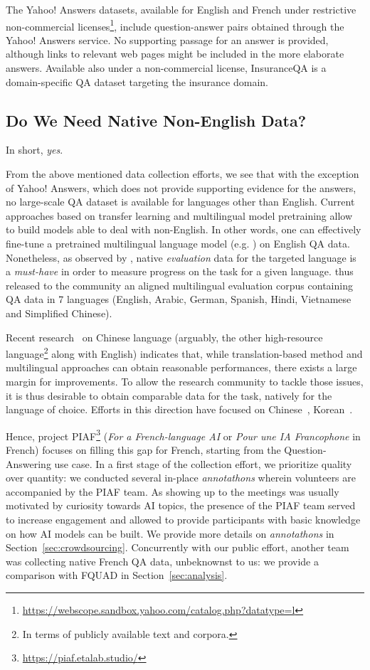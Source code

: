 \documentclass[10pt, a4paper]{article}
\begin{document}
The Yahoo! Answers datasets, available for English and French under restrictive non-commercial licenses\footnote{\url{https://webscope.sandbox.yahoo.com/catalog.php?datatype=l}}, include question-answer pairs obtained through the Yahoo! Answers service. No supporting passage for an answer is provided, although links to relevant web pages might be included in the more elaborate answers. Available also under a non-commercial license, InsuranceQA \cite{feng2015applying} is a domain-specific QA dataset targeting the insurance domain.

\subsection*{Do We Need Native Non-English Data?} 
In short, \emph{yes}. 

From the above mentioned data collection efforts, we see that with the exception of Yahoo! Answers, which does not provide supporting evidence for the answers, no large-scale  QA dataset is available for languages other than English. Current approaches based on transfer learning and multilingual model pretraining allow to build models able to deal with non-English. In other words, one can effectively fine-tune a pretrained multilingual language model (e.g. \cite{devlin2019bert}) on English QA data. Nonetheless, as observed by \cite{lewis2019mlqa}, native \emph{evaluation} data for the targeted language is a \emph{must-have} in order to measure progress on the task for a given language. \cite{lewis2019mlqa} thus released to the community an aligned multilingual evaluation corpus containing QA data in 7 languages (English, Arabic, German, Spanish, Hindi, Vietnamese and Simplified Chinese).

Recent research~\cite{xcmrc2019} on Chinese language (arguably, the other high-resource language\footnote{In terms of publicly available text and corpora.} along with English) indicates that, while translation-based method and multilingual approaches can obtain reasonable performances, there exists a large margin for improvements. To allow the research community to tackle those issues, it is thus desirable to obtain comparable data for the task, natively for the language of choice. Efforts in this direction have focused on Chinese~\cite{cui2018span}, Korean~\cite{lee-etal-2018-semi,2018korquad}. 

Hence, project PIAF\footnote{\url{https://piaf.etalab.studio/}} (\textit{For a French-language AI} or \textit{Pour une IA Francophone} in French) focuses on filling this gap for French, starting from the Question-Answering use case. In a first stage of the collection effort, we prioritize quality over quantity: we conducted several in-place \emph{annotathons} wherein volunteers are accompanied by the PIAF team. As showing up to the meetings was usually motivated by curiosity towards AI topics, the presence of the PIAF team served to increase engagement and allowed to provide participants with basic knowledge on how AI models can be built. We provide more details on \emph{annotathons} in Section~\ref{sec:crowdsourcing}. Concurrently with our public effort, another team was collecting native French QA data, unbeknownst to us: we provide a comparison with FQUAD \cite{d2020fquad} in Section~\ref{sec:analysis}.
\end{document}

